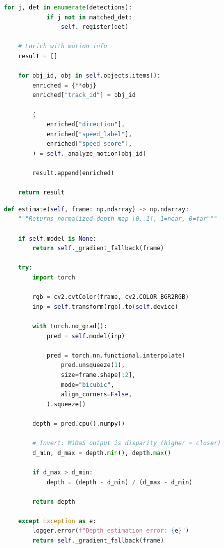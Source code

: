 \begin{lstlisting}[language=Python, caption={Object Tracking Function}, label={lst:tracking_update}]
        for j, det in enumerate(detections):
            if j not in matched_det:
                self._register(det)

    # Enrich with motion info
    result = []

    for obj_id, obj in self.objects.items():
        enriched = {**obj}
        enriched["track_id"] = obj_id

        (
            enriched["direction"],
            enriched["speed_label"],
            enriched["speed_score"],
        ) = self._analyze_motion(obj_id)

        result.append(enriched)

    return result
\end{lstlisting}

\begin{lstlisting}[language=Python, caption={Depth Estimation Function Using MiDaS}, label={lst:depth_estimation}]
def estimate(self, frame: np.ndarray) -> np.ndarray:
    """Returns normalized depth map [0..1], 1=near, 0=far"""
    
    if self.model is None:
        return self._gradient_fallback(frame)

    try:
        import torch

        rgb = cv2.cvtColor(frame, cv2.COLOR_BGR2RGB)
        inp = self.transform(rgb).to(self.device)

        with torch.no_grad():
            pred = self.model(inp)

            pred = torch.nn.functional.interpolate(
                pred.unsqueeze(1),
                size=frame.shape[:2],
                mode="bicubic",
                align_corners=False,
            ).squeeze()

        depth = pred.cpu().numpy()

        # Invert: MiDaS output is disparity (higher = closer)
        d_min, d_max = depth.min(), depth.max()

        if d_max > d_min:
            depth = (depth - d_min) / (d_max - d_min)

        return depth

    except Exception as e:
        logger.error(f"Depth estimation error: {e}")
        return self._gradient_fallback(frame)
\end{lstlisting}

